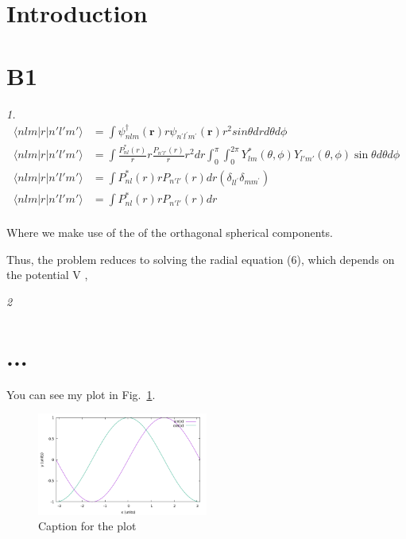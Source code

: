 \documentclass[12pt,a4paper,onecolumn]{article}%
\begin{document}
\section{Introduction}


\section{B1}

\textit{1.}
\begin{align*}
\langle nlm|r|n'l'm' \rangle &= \int \psi_{nlm}^\dag(\mathbf{r})r\psi_{n^\prime l^\prime m^\prime} (\mathbf{r}) r^2 sin\theta dr d\theta d\phi\\
\langle nlm|r|n'l'm' \rangle &= \int \frac{P^*_{nl}(r)}{r} r \frac{P_{n'l'}(r)}{r} r^2 dr \int_0^\pi \int_0^{2\pi} Y_{lm}^*(\theta, \phi) Y_{l'm'}(\theta, \phi) \sin \theta d\theta d\phi\\
\langle nlm|r|n'l'm' \rangle &= \int P^*_{nl}(r) r P_{n'l'}(r)  dr  \left(\delta_{ll^\prime}  \delta_{mm^\prime}\right)\\
\langle nlm|r|n'l'm' \rangle &= \int P^*_{nl}(r) r P_{n'l'}(r) dr   \\
\end{align*}

Where we make use of the of the orthagonal spherical components.

Thus, the problem reduces to solving the radial equation (6), which depends on the potential V ,

\textit{2}
\section{...}

You can see my plot in Fig.~\ref{fig:my-plot}.

\begin{figure}[h!]
\centering
\includegraphics[width=0.5\textwidth]{Template-plot.png}
\caption{\label{fig:my-plot}Caption for the plot}
\end{figure}
\end{document}
